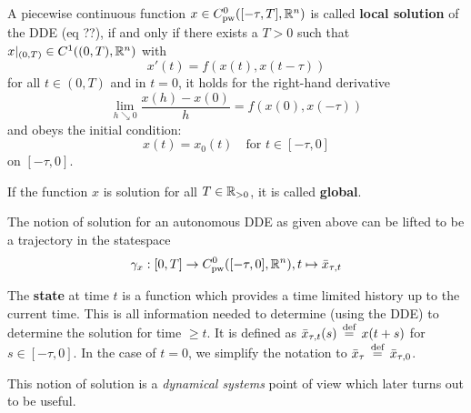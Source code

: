 \documentclass[10pt]{article}
\begin{document}
\begin{definition}
    \label{definition-solution-dde}

    A piecewise continuous function $x\in C^0_\text{pw}([-\tau,T],\mathbb{R}^n)$ is called \textbf{local solution} of the DDE (eq ??), if and only if there exists a $T>0$ such that $x|_{(0,T)}\in C^1((0,T),\mathbb{R}^n)$ with
    \begin{equation}
        x'(t) = f\left(x(t),x(t-\tau)\right)
    \end{equation}
    for all $t\in (0,T)$ and in $t=0$, it holds for the right-hand derivative \begin{equation}
        \lim_{h\searrow 0}\frac{x(h)-x(0)}{h}=f(x(0),x(-\tau))
    \end{equation}
    and obeys the initial condition:
    \begin{equation}
        x(t) = x_0(t) \quad\text{for } t\in [-\tau,0]
    \end{equation}
    on $[-\tau,0]$.



    If the function $x$ is solution for all $T\in\mathbb{R}_{>0}$, it is called \textbf{global}.

\end{definition}

The notion of solution for an autonomous DDE as given above can be lifted to be a trajectory in the statespace
\begin{equation}
    \gamma_x:[0,T]\rightarrow C^0_\text{pw}([-\tau,0],\mathbb{R}^n),\\ t\mapsto\bar{x}_{\tau,t}
\end{equation}

The \textbf{state} at time $t$ is a function which provides a time limited history up to the current time. This is all information needed to determine (using the DDE) to determine the solution for time $\geq t$. It is defined as $\bar{x}_{\tau,t}(s)\,\stackrel{\text{def}}{=}\, x(t+s)$ for $s\in [-\tau,0]$. In the case of $t=0$, we simplify the notation to $\bar{x}_{\tau} \,\stackrel{\text{def}}{=}\, \bar{x}_{\tau,0}$.

This notion of solution is a \emph{dynamical systems} point of view which later turns out to be useful.

\end{document}
